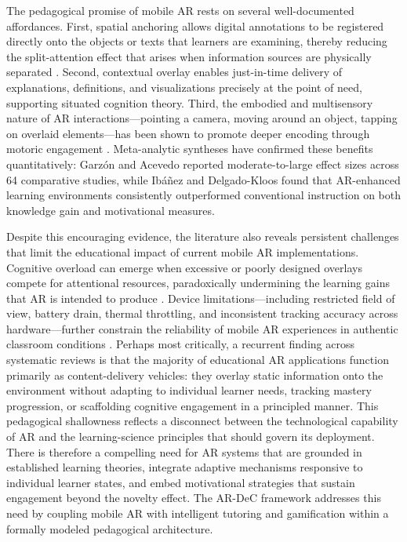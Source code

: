 The pedagogical promise of mobile AR rests on several well-documented affordances. First, spatial anchoring allows digital annotations to be registered directly onto the objects or texts that learners are examining, thereby reducing the split-attention effect that arises when information sources are physically separated \cite{Wu2013}. Second, contextual overlay enables just-in-time delivery of explanations, definitions, and visualizations precisely at the point of need, supporting situated cognition theory. Third, the embodied and multisensory nature of AR interactions---pointing a camera, moving around an object, tapping on overlaid elements---has been shown to promote deeper encoding through motoric engagement \cite{Akcayir2017}. Meta-analytic syntheses have confirmed these benefits quantitatively: Garz\'{o}n and Acevedo \cite{Garzon2019} reported moderate-to-large effect sizes across 64 comparative studies, while Ib\'{a}\~{n}ez and Delgado-Kloos \cite{Ibanez2018} found that AR-enhanced learning environments consistently outperformed conventional instruction on both knowledge gain and motivational measures.

Despite this encouraging evidence, the literature also reveals persistent challenges that limit the educational impact of current mobile AR implementations. Cognitive overload can emerge when excessive or poorly designed overlays compete for attentional resources, paradoxically undermining the learning gains that AR is intended to produce \cite{Bacca2014}. Device limitations---including restricted field of view, battery drain, thermal throttling, and inconsistent tracking accuracy across hardware---further constrain the reliability of mobile AR experiences in authentic classroom conditions \cite{Dey2018}. Perhaps most critically, a recurrent finding across systematic reviews is that the majority of educational AR applications function primarily as content-delivery vehicles: they overlay static information onto the environment without adapting to individual learner needs, tracking mastery progression, or scaffolding cognitive engagement in a principled manner. This pedagogical shallowness reflects a disconnect between the technological capability of AR and the learning-science principles that should govern its deployment. There is therefore a compelling need for AR systems that are grounded in established learning theories, integrate adaptive mechanisms responsive to individual learner states, and embed motivational strategies that sustain engagement beyond the novelty effect. The AR-DeC framework addresses this need by coupling mobile AR with intelligent tutoring and gamification within a formally modeled pedagogical architecture.

